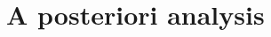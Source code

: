 \documentclass[10 pt]{beamer}
\begin{document}
\section{A posteriori analysis}
\subsection{}

%   
%
%
%
%
%
%
%
\end{document}
